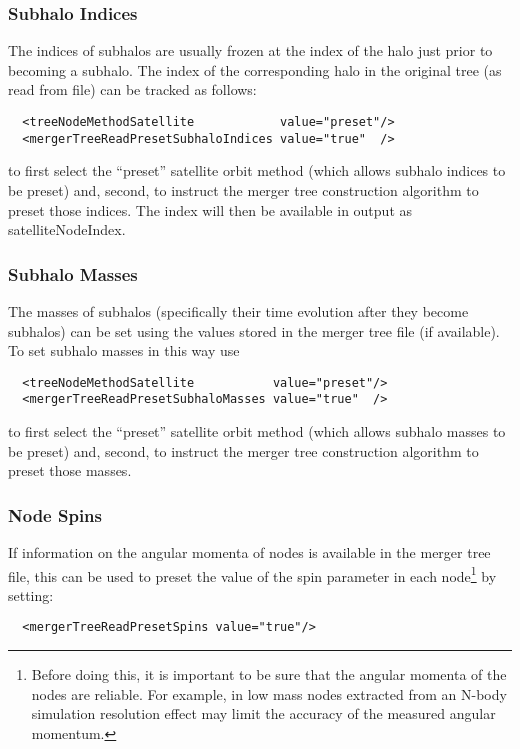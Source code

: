 \subsubsection{Subhalo Indices}

The indices of subhalos are usually frozen at the index of the halo just prior to becoming a subhalo. The index of the corresponding halo in the original tree (as read from file) can be tracked as follows:
\begin{verbatim}
  <treeNodeMethodSatellite            value="preset"/>
  <mergerTreeReadPresetSubhaloIndices value="true"  />
\end{verbatim}
to first select the ``preset'' satellite orbit method (which allows subhalo indices to be preset) and, second, to instruct the merger tree construction algorithm to preset those indices. The index will then be available in output as {\normalfont \ttfamily satelliteNodeIndex}.

\subsubsection{Subhalo Masses}

The masses of subhalos (specifically their time evolution after they become subhalos) can be set using the values stored in the merger tree file (if available). To set subhalo masses in this way use
\begin{verbatim}
  <treeNodeMethodSatellite           value="preset"/>
  <mergerTreeReadPresetSubhaloMasses value="true"  />
\end{verbatim}
to first select the ``preset'' satellite orbit method (which allows subhalo masses to be preset) and, second, to instruct the merger tree construction algorithm to preset those masses.

\subsubsection{Node Spins}

If information on the angular momenta of nodes is available in the merger tree file, this can be used to preset the value of the spin parameter in each node\footnote{Before doing this, it is important to be sure that the angular momenta of the nodes are reliable. For example, in low mass nodes extracted from an N-body simulation resolution effect may limit the accuracy of the measured angular momentum.} by setting:

\begin{verbatim}
  <mergerTreeReadPresetSpins value="true"/>
\end{verbatim}

